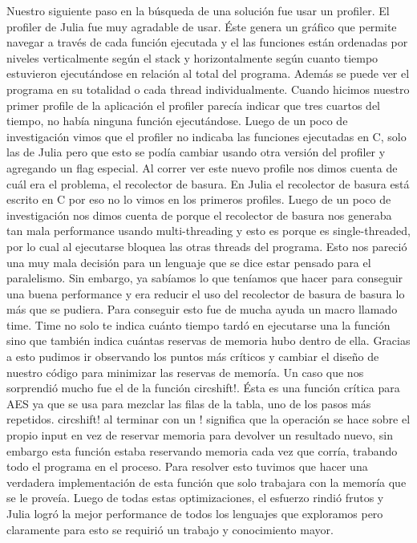 \documentclass[11pt]{article}
\begin{document}
Nuestro siguiente paso en la búsqueda de una solución fue usar un profiler. El profiler de Julia fue muy agradable de usar. Éste genera un gráfico que permite navegar a través de cada función ejecutada y el las funciones están ordenadas por niveles verticalmente según el stack y horizontalmente según cuanto tiempo estuvieron ejecutándose en relación al total del programa. Además se puede ver el programa en su totalidad o cada thread individualmente. Cuando hicimos nuestro primer profile de la aplicación el profiler parecía indicar que tres cuartos del tiempo, no había ninguna función ejecutándose. Luego de un poco de investigación vimos que el profiler no indicaba las funciones ejecutadas en C, solo las de Julia pero que esto se podía cambiar usando otra versión del profiler y agregando un flag especial. Al correr ver este nuevo profile nos dimos cuenta de cuál era el problema, el recolector de basura. En Julia el recolector de basura está escrito en C por eso no lo vimos en los primeros profiles. Luego de un poco de investigación nos dimos cuenta de porque el recolector de basura nos generaba tan mala performance usando multi-threading y esto es porque es single-threaded, por lo cual al ejecutarse bloquea las otras threads del programa. Esto nos pareció una muy mala decisión para un lenguaje que se dice estar pensado para el paralelismo. Sin embargo, ya sabíamos lo que teníamos que hacer para conseguir una buena performance y era reducir el uso del recolector de basura de basura lo más que se pudiera. Para conseguir esto fue de mucha ayuda un macro llamado time. Time no solo te indica cuánto tiempo tardó en ejecutarse una la función sino que también indica cuántas reservas de memoria hubo dentro de ella. Gracias a esto pudimos ir observando los puntos más críticos y cambiar el diseño de nuestro código para minimizar las reservas de memoría. Un caso que nos sorprendió mucho fue el de la función circshift!. Ésta es una función crítica para AES ya que se usa para mezclar las filas de la tabla, uno de los pasos más repetidos. circshift! al terminar con un ! significa que la operación se hace sobre el propio input en vez de reservar memoria para devolver un resultado nuevo, sin embargo esta función estaba reservando memoria cada vez que corría, trabando todo el programa en el proceso. Para resolver esto tuvimos que hacer una verdadera implementación de esta función que solo trabajara con la memoría que se le proveía. Luego de todas estas optimizaciones, el esfuerzo rindió frutos y Julia logró la mejor performance de todos los lenguajes que exploramos pero claramente para esto se requirió un trabajo y conocimiento mayor. %
\end{document}
